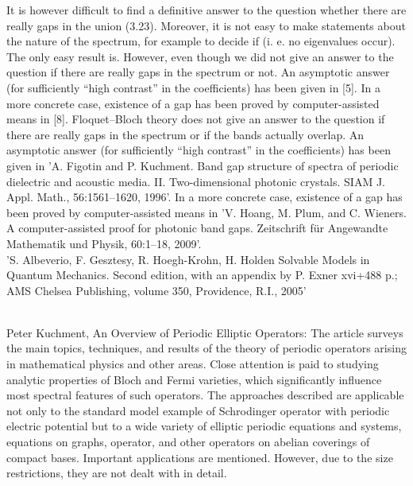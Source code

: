 It is however difficult to find a definitive answer to the question whether there are really gaps in the union (3.23). Moreover, it is not easy to make statements about the nature of the spectrum, for example to decide if (i. e. no eigenvalues occur). The only easy result is.	However, even though we did not give an answer to the question if there are really gaps in the spectrum or not. An asymptotic answer (for sufficiently “high contrast” in the coefficients) has been given in [5]. In a more concrete case, existence of a gap has been proved by computer-assisted means in [8]. Floquet–Bloch theory does not give an answer to the question if there are really gaps in the spectrum or if the bands actually overlap. An asymptotic answer (for sufficiently “high contrast” in the coefficients) has been given in 'A. Figotin and P. Kuchment. Band gap structure of spectra of periodic dielectric and acoustic media. II. Two-dimensional photonic crystals. SIAM J. Appl. Math., 56:1561–1620, 1996'. In a more concrete case, existence of a gap has been proved by computer-assisted means in 'V. Hoang, M. Plum, and C. Wieners. A computer-assisted proof for photonic band gaps. Zeitschrift für Angewandte Mathematik und Physik, 60:1–18, 2009'.
~\\
'S. Albeverio, F. Gesztesy, R. Hoegh-Krohn, H. Holden Solvable Models in Quantum Mechanics. Second edition, with an appendix by P. Exner xvi+488 p.; AMS Chelsea Publishing, volume 350, Providence, R.I., 2005'

~\\

Peter Kuchment, An Overview of Periodic Elliptic Operators: The article surveys the main topics, techniques, and results of the theory of periodic operators arising in mathematical physics and other areas. Close attention is paid to studying analytic properties of Bloch and Fermi varieties, which significantly influence most spectral features of such operators. The approaches described are applicable not only to the standard model example of Schrodinger operator with periodic electric potential but to a wide variety of elliptic periodic equations and systems, equations on graphs, operator, and other operators on abelian coverings of compact bases. Important applications are mentioned. However, due to the size restrictions, they are not dealt with in detail.

~\\

